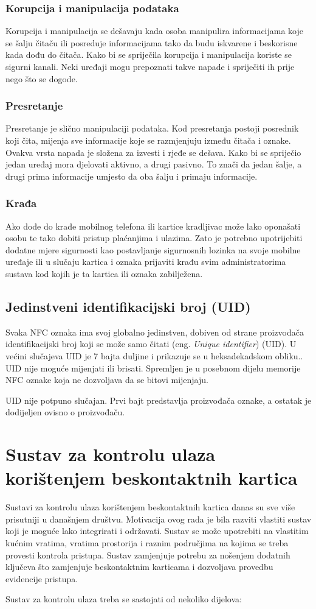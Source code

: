 \documentclass[times, utf8, zavrsni]{fer}
\begin{document}
\subsection{Korupcija i manipulacija podataka}
Korupcija i manipulacija se dešavaju kada osoba manipulira informacijama koje se šalju čitaču ili posreduje informacijama tako da budu iskvarene i beskorisne kada dođu do čitača. Kako bi se spriječila korupcija i manipulacija koriste se sigurni kanali. Neki uređaji mogu prepoznati takve napade i spriječiti ih prije nego što se dogode.
\subsection{Presretanje}
Presretanje je slično manipulaciji podataka. Kod presretanja postoji posrednik koji čita, mijenja sve informacije koje se razmjenjuju između čitača i oznake. Ovakva vrsta napada je složena za izvesti i rjeđe se dešava. Kako bi se spriječio jedan uređaj mora djelovati aktivno, a drugi pasivno. To znači da jedan šalje, a drugi prima informacije umjesto da oba šalju i primaju informacije.
\subsection{Krađa}
Ako dođe do krađe mobilnog telefona ili kartice kradljivac može lako oponašati osobu te tako dobiti pristup plaćanjima i ulazima. Zato je potrebno upotrijebiti dodatne mjere sigurnosti kao postavljanje sigurnosnih lozinka na svoje mobilne uređaje ili u slučaju kartica i oznaka prijaviti krađu svim administratorima sustava kod kojih je ta kartica ili oznaka zabilježena. \citep{6}

\section{Jedinstveni identifikacijski broj (UID)}
Svaka NFC oznaka ima svoj globalno jedinstven, dobiven od strane proizvođača identifikacijski broj koji se može samo čitati (eng. \textit{Unique identifier}) (UID). U većini slučajeva UID je 7 bajta duljine i prikazuje se u heksadekadskom obliku.. UID nije moguće mijenjati ili brisati. Spremljen je u posebnom dijelu memorije NFC oznake koja ne dozvoljava da se bitovi mijenjaju. \par 
UID nije potpuno slučajan. Prvi bajt predstavlja proizvođača oznake, a ostatak je dodijeljen ovisno o proizvođaču.
\citep{7}

\chapter{Sustav za kontrolu ulaza korištenjem beskontaktnih kartica}
Sustavi za kontrolu ulaza korištenjem beskontaktnih kartica danas su sve više prisutniji u današnjem društvu. Motivacija ovog rada je bila razviti vlastiti sustav koji je moguće lako integrirati i održavati. Sustav se može upotrebiti na vlastitim kućnim vratima, vratima prostorija i raznim područjima na kojima se treba provesti kontrola pristupa. Sustav zamjenjuje potrebu za nošenjem dodatnih ključeva što zamjenjuje beskontaktnim karticama i dozvoljava provedbu evidencije pristupa.  \par
Sustav za kontrolu ulaza treba se sastojati od nekoliko dijelova:
\end{document}
